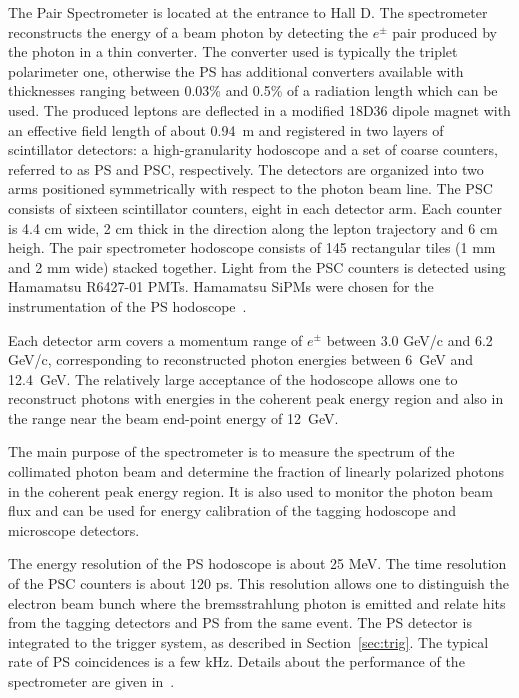 The Pair Spectrometer \cite{BARBOSA2015376} is located at the entrance to Hall D.
The spectrometer reconstructs the energy of a beam photon by detecting the $e^\pm$ pair produced by the photon in a thin converter.
The converter used is typically the triplet polarimeter one, otherwise the PS has additional converters available with thicknesses ranging between 0.03\% and 0.5\% of a radiation length which can be used.
The produced leptons are deflected in a modified 18D36 dipole magnet with an effective field length of about 0.94~m and registered in two layers of scintillator
detectors: a high-granularity hodoscope and a set of coarse counters,
referred to as PS and PSC, respectively. The detectors are organized into two arms positioned symmetrically with respect to the photon beam line. The PSC consists of sixteen scintillator counters, eight in each detector arm. Each counter is 4.4 cm wide, 2 cm thick in the direction along the lepton trajectory and 6 cm heigh. The pair spectrometer hodoscope consists of 145 rectangular 
tiles (1 mm and 2 mm wide) stacked together. Light from the PSC counters is detected using Hamamatsu R6427-01 PMTs. Hamamatsu SiPMs were chosen for the instrumentation of the PS hodoscope~\cite{Barbosa:2017zzw,Somov:2017kif,Tolstukhin:2014zsa}.

Each detector arm covers a momentum range of $e^\pm$ between 3.0 GeV/c and 6.2 GeV/c, 
corresponding to reconstructed photon energies between 6~GeV and 12.4~GeV. The relatively
large acceptance of the hodoscope allows one to reconstruct photons
with energies in the coherent peak energy region and also in the range
near the beam end-point energy of 12~GeV.

The main purpose of the spectrometer is to measure the spectrum of the
collimated photon beam and determine the fraction of linearly polarized
photons in the coherent peak energy region.
It is also used to monitor the photon beam flux and can be used for 
energy calibration of the tagging hodoscope and microscope detectors.

The energy resolution of the PS hodoscope is about 25 MeV.
The time resolution of the PSC counters is about 120 ps. This resolution
allows one to distinguish the electron beam bunch where the bremsstrahlung photon is emitted and relate hits from the tagging detectors and PS
from the same event. The PS detector is integrated to the trigger system, as described in Section~\ref{sec:trig}. The typical rate of PS coincidences is
a few kHz. Details about the performance of the spectrometer are given in~\cite{Somov:2017vhp,Somov:2016bgb}.

